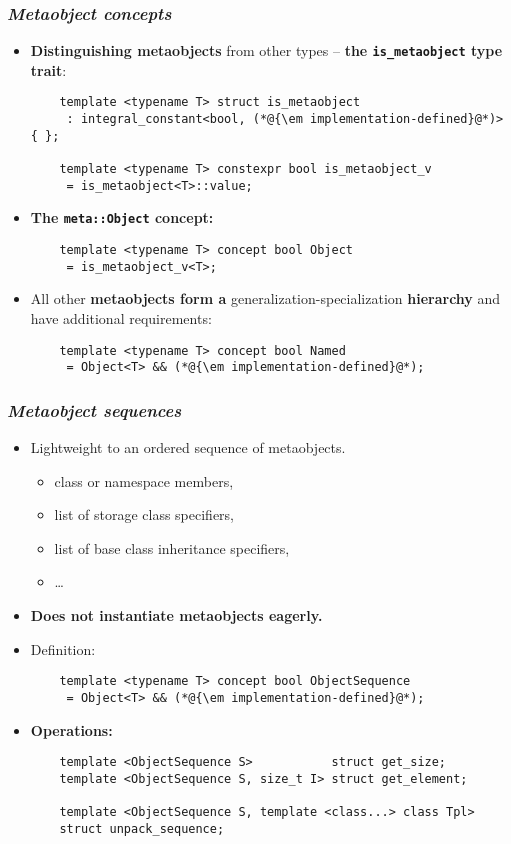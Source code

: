 \documentclass[compress,table,xcolor=table]{beamer}
\begin{document}
\begin{frame}[fragile]
\frametitle{{\em Metaobject concepts}}
  \begin{itemize}
    \item \textbf{Distinguishing metaobjects} from other types -- \textbf{the
    \texttt{is\_metaobject} type trait}:
    \begin{lstlisting}
	template <typename T> struct is_metaobject 
	 : integral_constant<bool, (*@{\em implementation-defined}@*)> { };

	template <typename T> constexpr bool is_metaobject_v
	 = is_metaobject<T>::value;
    \end{lstlisting}
    \item \textbf{The \texttt{meta::Object} concept:}
    \begin{lstlisting}
	template <typename T> concept bool Object
	 = is_metaobject_v<T>;
    \end{lstlisting}
    \item All other \textbf{metaobjects form a} generalization-specialization
      \textbf{hierarchy} and have additional requirements:
    \begin{lstlisting}
	template <typename T> concept bool Named
	 = Object<T> && (*@{\em implementation-defined}@*);
    \end{lstlisting}
  \end{itemize}
\end{frame}

\begin{frame}[fragile]
\frametitle{{\em Metaobject sequences}}
  \begin{itemize}
    \item Lightweight  to an ordered sequence of metaobjects.
    \begin{itemize}
      \footnotesize
      \item class or namespace members,
      \item list of storage class specifiers,
      \item list of base class inheritance specifiers,
      \item \ldots
    \end{itemize}
    \item \textbf{Does not instantiate  metaobjects eagerly.}
    \item Definition:
    \begin{lstlisting}
	template <typename T> concept bool ObjectSequence
	 = Object<T> && (*@{\em implementation-defined}@*);
    \end{lstlisting}
    \item \textbf{Operations:}
    \begin{lstlisting}
	template <ObjectSequence S>           struct get_size;
	template <ObjectSequence S, size_t I> struct get_element;

	template <ObjectSequence S, template <class...> class Tpl>
	struct unpack_sequence;
    \end{lstlisting}
  \end{itemize}
\end{frame}
\end{document}
